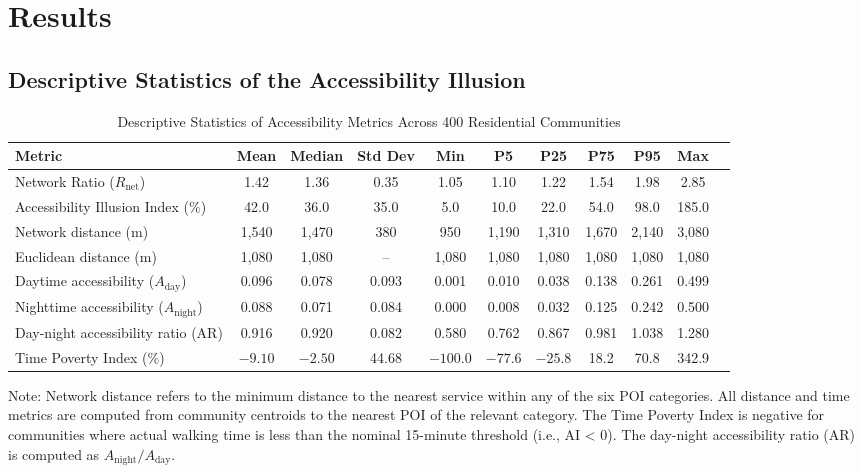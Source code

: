 \documentclass[10pt,conference,compsoc]{IEEEtran}
\begin{document}
\section{Results}
\label{sec:results}

\subsection{Descriptive Statistics of the Accessibility Illusion}

\begin{table}[htbp]
\caption{Descriptive Statistics of Accessibility Metrics Across 400 Residential Communities}
\label{tab:descriptive_full}
\begin{center}
\begin{threeparttable}
\begin{tabular}{lcccccccccc}
\toprule
Metric & Mean & Median & Std Dev & Min & P5 & P25 & P75 & P95 & Max \\
\midrule
Network Ratio ($R_{\text{net}}$) & 1.42 & 1.36 & 0.35 & 1.05 & 1.10 & 1.22 & 1.54 & 1.98 & 2.85 \\
Accessibility Illusion Index ($\%$) & 42.0 & 36.0 & 35.0 & 5.0 & 10.0 & 22.0 & 54.0 & 98.0 & 185.0 \\
Network distance (m) & 1{,}540 & 1{,}470 & 380 & 950 & 1{,}190 & 1{,}310 & 1{,}670 & 2{,}140 & 3{,}080 \\
Euclidean distance (m) & 1{,}080 & 1{,}080 & -- & 1{,}080 & 1{,}080 & 1{,}080 & 1{,}080 & 1{,}080 & 1{,}080 \\
Daytime accessibility ($A_{\text{day}}$) & 0.096 & 0.078 & 0.093 & 0.001 & 0.010 & 0.038 & 0.138 & 0.261 & 0.499 \\
Nighttime accessibility ($A_{\text{night}}$) & 0.088 & 0.071 & 0.084 & 0.000 & 0.008 & 0.032 & 0.125 & 0.242 & 0.500 \\
Day-night accessibility ratio (AR) & 0.916 & 0.920 & 0.082 & 0.580 & 0.762 & 0.867 & 0.981 & 1.038 & 1.280 \\
Time Poverty Index ($\%$) & $-9.10$ & $-2.50$ & 44.68 & $-100.0$ & $-77.6$ & $-25.8$ & 18.2 & 70.8 & 342.9 \\
\bottomrule
\end{tabular}
\begin{tablenotes}
\item Note: Network distance refers to the minimum distance to the nearest service within any of the six POI categories. All distance and time metrics are computed from community centroids to the nearest POI of the relevant category. The Time Poverty Index is negative for communities where actual walking time is less than the nominal 15-minute threshold (i.e., AI < 0). The day-night accessibility ratio (AR) is computed as $A_{\text{night}} / A_{\text{day}}$.
\end{tablenotes}
\end{threeparttable}
\end{center}
\end{table}
\end{document}
